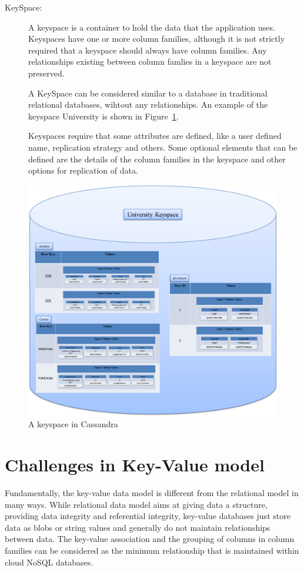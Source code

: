 \begin{description}
\item [KeySpace:] A keyspace is a container to hold the data that the
application uses. Keyspaces have one or more column families, although it is not strictly
required that a keyspace should always have column families. Any relationships
existing between column famlies in a keyspace are not preserved.

A KeySpace can be considered similar to a database in traditional relational
databases, wihtout any relationships. An example of the keyspace
University is shown in Figure~\ref{f:keyspace}.

Keyspaces require that some attributes are defined, like a user defined name,
replication strategy and others. Some optional elements that can be defined are
the details of the column families in the keyspace and other options
for replication of data.
\end{description}

\newpage

\begin{figure}[H]
	\centering
	\includegraphics[width=.8\textwidth]{./figure/Example/KEYSPACE.png}
	\caption{A keyspace in
	Cassandra}\label{f:keyspace}
\end{figure}


\section{Challenges in Key-Value model}\label{s:challenges-key-value}
Fundamentally, the key-value data model is different from the relational model
in many ways. While relational data model aims at giving data a structure,
providing data integrity and referential integrity, key-value databases just
store data as \acp{blob} or string values and generally do not maintain
relationships between data. The key-value association and the grouping of
columns in column families can be considered as the minimum relationship that is
maintained within cloud \ac{NoSQL} databases. 


